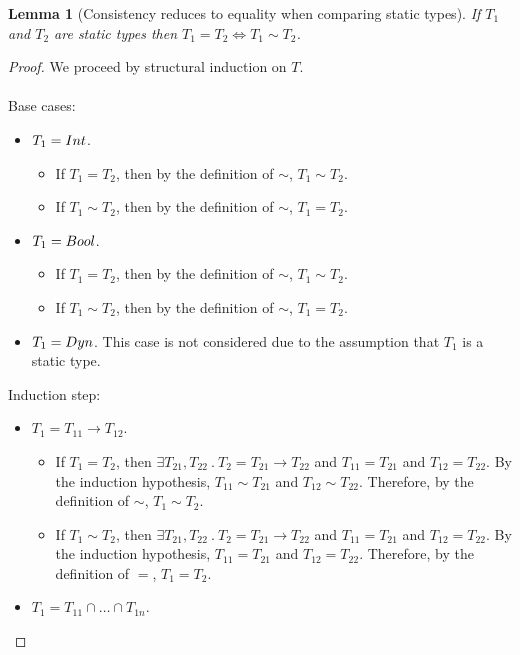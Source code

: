 \documentclass[a4paper]{article}
\newtheorem{lemma}{Lemma}
\begin{document}
\begin{lemma}[Consistency reduces to equality when comparing static types]
\label{consistencytoequality}
If $T_1$ and $T_2$ are static types then $T_1 = T_2 \iff T_1 \sim T_2$.
\end{lemma}
\begin{proof}
We proceed by structural induction on $T$.\\\\
Base cases:
\begin{itemize}
    \item $T_1 = {Int}$.
    \begin{itemize}
        \item If $T_1 = T_2$, then by the definition of $\sim$, $T_1 \sim T_2$.
        \item If $T_1 \sim T_2$, then by the definition of $\sim$, $T_1 = T_2$.
    \end{itemize}
    \item $T_1 = Bool$.
    \begin{itemize}
        \item If $T_1 = T_2$, then by the definition of $\sim$, $T_1 \sim T_2$.
        \item If $T_1 \sim T_2$, then by the definition of $\sim$, $T_1 = T_2$.
    \end{itemize}
    \item $T_1 = Dyn$.
    This case is not considered due to the assumption that $T_1$ is a static type.
\end{itemize}
Induction step:
\begin{itemize}
    \item $T_1 = T_{11} \rightarrow T_{12}$.
    \begin{itemize}
        \item If $T_1 = T_2$, then $\exists T_{21}, T_{22}\ .\ T_2 = T_{21} \rightarrow T_{22}$ and $T_{11} = T_{21}$ and $T_{12} = T_{22}$.
        By the induction hypothesis, $T_{11} \sim T_{21}$ and $T_{12} \sim T_{22}$.
        Therefore, by the definition of $\sim$, $T_1 \sim T_2$.
        \item If $T_1 \sim T_2$, then $\exists T_{21}, T_{22}\ .\ T_2 = T_{21} \rightarrow T_{22}$ and $T_{11} = T_{21}$ and $T_{12} = T_{22}$.
        By the induction hypothesis, $T_{11} = T_{21}$ and $T_{12} = T_{22}$.
        Therefore, by the definition of $=$, $T_1 = T_2$.
    \end{itemize}
    \item $T_1 = T_{11} \cap \ldots \cap T_{1n}$.
    \begin{itemize}

\end{itemize}
\end{itemize}
\end{proof}
\end{document}
